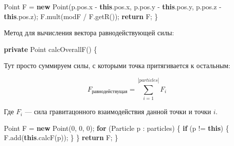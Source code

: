\documentclass[
  12pt,
  a4paper,
]{article}
\newenvironment{Shaded}{}{}
\newcommand{\BuiltInTok}[1]{#1}
\newcommand{\ControlFlowTok}[1]{\textcolor[rgb]{0.00,0.44,0.13}{\textbf{#1}}}
\newcommand{\DecValTok}[1]{\textcolor[rgb]{0.25,0.63,0.44}{#1}}
\newcommand{\FunctionTok}[1]{\textcolor[rgb]{0.02,0.16,0.49}{#1}}
\newcommand{\KeywordTok}[1]{\textcolor[rgb]{0.00,0.44,0.13}{\textbf{#1}}}
\newcommand{\NormalTok}[1]{#1}
\newcommand{\OperatorTok}[1]{\textcolor[rgb]{0.40,0.40,0.40}{#1}}
\begin{document}
\begin{Shaded}
\begin{Highlighting}[]
    \BuiltInTok{Point}\NormalTok{ F }\OperatorTok{=} \KeywordTok{new} \BuiltInTok{Point}\OperatorTok{(}\NormalTok{p}\OperatorTok{.}\FunctionTok{pos}\OperatorTok{.}\FunctionTok{x} \OperatorTok{{-}} \KeywordTok{this}\OperatorTok{.}\FunctionTok{pos}\OperatorTok{.}\FunctionTok{x}\OperatorTok{,}
\NormalTok{                        p}\OperatorTok{.}\FunctionTok{pos}\OperatorTok{.}\FunctionTok{y} \OperatorTok{{-}} \KeywordTok{this}\OperatorTok{.}\FunctionTok{pos}\OperatorTok{.}\FunctionTok{y}\OperatorTok{,}
\NormalTok{                        p}\OperatorTok{.}\FunctionTok{pos}\OperatorTok{.}\FunctionTok{z} \OperatorTok{{-}} \KeywordTok{this}\OperatorTok{.}\FunctionTok{pos}\OperatorTok{.}\FunctionTok{z}\OperatorTok{);}
\NormalTok{    F}\OperatorTok{.}\FunctionTok{mult}\OperatorTok{(}\NormalTok{modF }\OperatorTok{/}\NormalTok{ F}\OperatorTok{.}\FunctionTok{getR}\OperatorTok{());}
    \ControlFlowTok{return}\NormalTok{ F}\OperatorTok{;}
\OperatorTok{\}}
\end{Highlighting}
\end{Shaded}

Метод для вычисления вектора равнодействующей силы:

\begin{Shaded}
\begin{Highlighting}[]
\KeywordTok{private} \BuiltInTok{Point} \FunctionTok{calcOverallF}\OperatorTok{()} \OperatorTok{\{}
\end{Highlighting}
\end{Shaded}

Тут просто суммируем силы, с которыми точка притягивается к остальным:

\begin{equation*}
F_{\text{равнодействущая}} = \sum_{i=1}^{|particles|}{F_{i}}
\end{equation*}

Где \(F_{i}\) --- сила гравитацонного взаимодействия данной точки и
точки \(i\).

\begin{Shaded}
\begin{Highlighting}[]
    \BuiltInTok{Point}\NormalTok{ F }\OperatorTok{=} \KeywordTok{new} \BuiltInTok{Point}\OperatorTok{(}\DecValTok{0}\OperatorTok{,} \DecValTok{0}\OperatorTok{,} \DecValTok{0}\OperatorTok{);}
    \ControlFlowTok{for} \OperatorTok{(}\NormalTok{Particle p }\OperatorTok{:}\NormalTok{ particles}\OperatorTok{)} \OperatorTok{\{}
        \ControlFlowTok{if} \OperatorTok{(}\NormalTok{p }\OperatorTok{!=} \KeywordTok{this}\OperatorTok{)} \OperatorTok{\{}
\NormalTok{            F}\OperatorTok{.}\FunctionTok{add}\OperatorTok{(}\KeywordTok{this}\OperatorTok{.}\FunctionTok{calcF}\OperatorTok{(}\NormalTok{p}\OperatorTok{));}
        \OperatorTok{\}}
    \OperatorTok{\}}
    \ControlFlowTok{return}\NormalTok{ F}\OperatorTok{;}
\OperatorTok{\}}
\end{Highlighting}
\end{Shaded}
\end{document}
